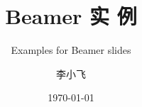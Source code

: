 \documentclass[7pt,UTF8,aspectratio=169]{beamer}
\begin{document}

\author{李小飞}
\title{\textbf{\Huge Beamer 实 例}}
\subtitle{Examples for Beamer slides}
\date{\today}


\begin{frame} [plain]
     {} %
    \maketitle
    \addtocounter{framenumber}{-1} 
\end{frame}

%
%


%
\end{document}
